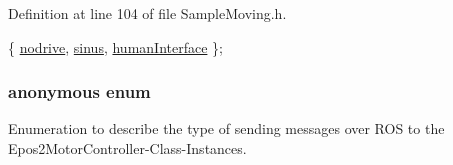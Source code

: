 Definition at line 104 of file Sample\-Moving.\-h.


\begin{DoxyCode}
        \{
            \hyperlink{classSampleMoving_a41123bbf6a4408e82424c92a414fa524a7c0a083c39ec97797c0b28909fa3474b}{nodrive}, 
            \hyperlink{classSampleMoving_a41123bbf6a4408e82424c92a414fa524a40b19ec7388083907df9c6d5284e89cd}{sinus}, 
            \hyperlink{classSampleMoving_a41123bbf6a4408e82424c92a414fa524a965c7cf26ddac600016e6d8e003bb70c}{humanInterface}    
        \};
\end{DoxyCode}
\hypertarget{classSampleMoving_a68852e46a4c2887978990a7dd92bc66e}{\subsubsection[{anonymous enum}]{\setlength{\rightskip}{0pt plus 5cm}anonymous enum}}\label{classSampleMoving_a68852e46a4c2887978990a7dd92bc66e}


Enumeration to describe the type of sending messages over R\-O\-S to the Epos2\-Motor\-Controller-\/\-Class-\/\-Instances. 

